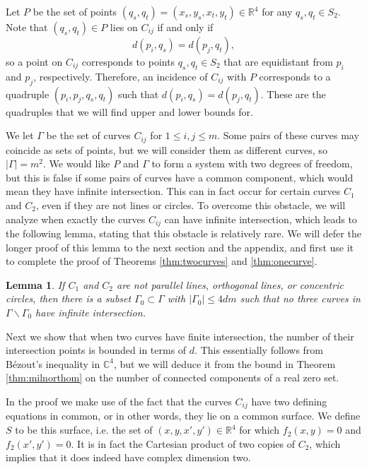 \documentclass[12pt]{article}
\newtheorem{lemma}[theorem]{Lemma}
\newcommand{\RR}{\mathbb R}
\newcommand{\CC}{\mathbb C}
\begin{document}
Let $P$ be the set of points $(q_s,q_t) =(x_s,y_s,x_t,y_t)\in \RR^4$ 
for any $q_s,q_t\in S_2$.
Note that $(q_s,q_t) \in P$ lies on $C_{ij}$ if and only if
$$d(p_i, q_s) = d(p_j, q_t),$$
so a point on $C_{ij}$ corresponds to points $q_s,q_t\in S_2$
that are equidistant from $p_i$ and $p_j$, respectively.
Therefore, an incidence of $C_{ij}$ with $P$ 
corresponds to a quadruple $(p_i,p_j,q_s,q_t)$
such that $d(p_i, q_s) = d(p_j, q_t)$.
These are the quadruples that we will find upper and lower bounds for.
 
We let $\Gamma$ be the set of curves $C_{ij}$ for $1\leq i,j \leq m$.
Some pairs of these curves may coincide as sets of points,
but we will consider them as different curves, so $|\Gamma| =m^2$. 
We would like $P$ and $\Gamma$ to form a system with two degrees of freedom,
but this is false if some pairs of curves have a common component,
which would mean they have infinite intersection.
This can in fact occur for certain curves $C_1$ and $C_2$,
even if they are not lines or circles.
To overcome this obstacle, we will analyze when exactly the curves $C_{ij}$ can have infinite intersection,
which leads to the following lemma, stating that this obstacle is relatively rare.
We will defer the longer proof of this lemma to the next section and the appendix, 
and first use it to complete the proof of Theorems \ref{thm:twocurves} and \ref{thm:onecurve}.
 
 
\begin{lemma}\label{lem:infinite}
 If $C_1$ and $C_2$ are not parallel lines, orthogonal lines, or concentric circles,
 then there is a subset $\Gamma_0\subset \Gamma$ with $|\Gamma_0|\leq 4dm$ such that
 no three curves in $\Gamma\backslash \Gamma_0$ have infinite intersection.
\end{lemma}
 
Next we show that when two curves have finite intersection, 
the number of their intersection points is bounded in terms of $d$.
This essentially follows from B\'ezout's inequality in $\CC^4$, 
but we will deduce it from the bound in Theorem \ref{thm:milnorthom} on the number of connected components of a real zero set.

In the proof we make use of the fact that the curves $C_{ij}$ have two defining equations in common,
or in other words, they lie on a common surface.
We define $S$ to be this surface, i.e. the set of $(x,y,x',y')\in\RR^4$ 
for which $f_2(x,y)=0$ and $f_2(x',y') = 0$.
It is in fact the Cartesian product of two copies of $C_2$,
which implies that it does  indeed have complex dimension two.
\end{document}
